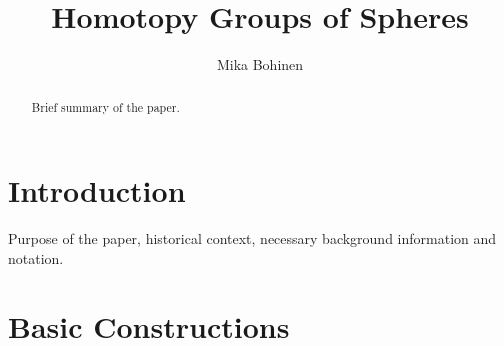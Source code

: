 \documentclass[a4paper, article, oneside, UKenglish]{memoir}
\title{Homotopy Groups of Spheres}
\author{Mika Bohinen}
\newcommand{\0}{\mathbf{0}}
\newcommand{\1}{\mathbf{1}}
\begin{document}
\projectfrontpage


\begin{abstract}
    \noindent
    Brief summary of the paper.
\end{abstract}


\chapter{Introduction}

Purpose of the paper, historical context, necessary background information and notation.


\chapter{Basic Constructions}



\printbibliography
\end{document}
